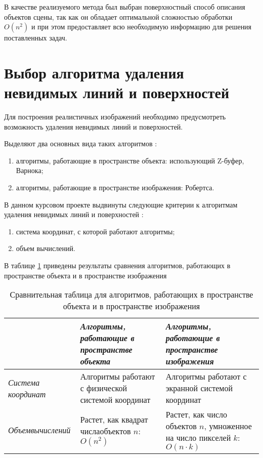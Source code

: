 В качестве реализуемого метода был выбран поверхностный способ описания объектов сцены, так как он обладает оптимальной сложностью обработки $O(n^2)$ и при этом предоставляет всю необходимую информацию для решения поставленных задач.

\clearpage

\section{Выбор алгоритма удаления невидимых линий и поверхностей}

Для построения реалистичных изображений необходимо предусмотреть возможность удаления невидимых линий и поверхностей.

Выделяют два основных вида таких алгоритмов \cite{invisible1}:
\begin{enumerate}
	\item алгоритмы, работающие в пространстве объекта: использующий Z-буфер, Варнока;
	\item алгоритмы, работающие в пространстве изображения: Робертса.
\end{enumerate}

В данном курсовом проекте выдвинуты следующие критерии к алгоритмам удаления невидимых линий и поверхностей \cite{compareInvisible1}:
\begin{enumerate}
	\item система координат, с которой работают алгоритмы;
	\item объем вычислений.
\end{enumerate}

В таблице \ref{table:compareInvisible} приведены результаты сравнения алгоритмов, работающих в пространстве объекта и в пространстве изображения \cite{compareInvisible1}
\begin{table}[h!]
	\begin{center}
		\caption{\label{table:compareInvisible} Сравнительная таблица для алгоритмов, работающих в пространстве объекта и в пространстве изображения}
		\begin{tabular}{|p{70pt}|p{190pt}|p{190pt}|}
			\hline
			~ & \textit{Алгоритмы, работающие в пространстве объекта} &\textit{Алгоритмы, работающие в пространстве изображения} \\ \hline
			\textit{Система координат} & Алгоритмы работают с физической системой координат & Алгоритмы работают с экранной системой координат \\ \hline
			\textit{Объем\newline вычислений} & Растет, как квадрат числа\newline объектов $n$: $O(n^2)$ & Растет, как число объектов $n$, умноженное на число пикселей $k$: $O(n \cdot k)$ \\ \hline
		\end{tabular}
	\end{center}
\end{table}

